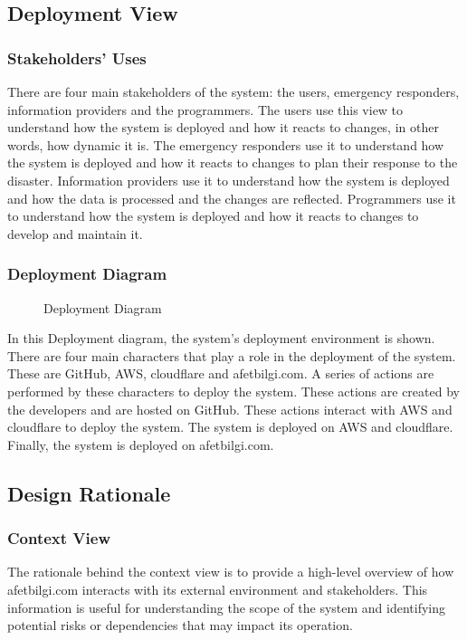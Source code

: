 \documentclass[a4paper]{article}
\begin{document}
    \subsection{Deployment View}
    \subsubsection{Stakeholders' Uses}
    There are four main stakeholders of the system: the users, emergency responders, information providers and the programmers.
    The users use this view to understand how the system is deployed and how it reacts to changes, in other words, how dynamic it is.
    The emergency responders use it to understand how the system is deployed and how it reacts to changes to plan their response
    to the disaster. Information providers use it to understand how the system is deployed and how the data is processed and the
    changes are reflected. Programmers use it to understand how the system is deployed and how it reacts to changes to develop
    and maintain it.
    \subsubsection{Deployment Diagram}

    \begin{figure}
        
        \caption{Deployment Diagram}
    \end{figure}

    In this Deployment diagram, the system’s deployment environment is shown. There are four main characters that play a role in
    the deployment of the system. These are GitHub, AWS, cloudflare and afetbilgi.com. A series of actions are performed by these
    characters to deploy the system. These actions are created by the developers and are hosted on GitHub. These actions interact
    with AWS and cloudflare to deploy the system. The system is deployed on AWS and cloudflare. Finally, the system is deployed
    on afetbilgi.com.

    \subsection{Design Rationale}
    \subsubsection{Context View}
    The rationale behind the context view is to provide a high-level overview of how afetbilgi.com interacts with its external
    environment and stakeholders. This information is useful for understanding the scope of the system and identifying potential
    risks or dependencies that may impact its operation.
\end{document}
